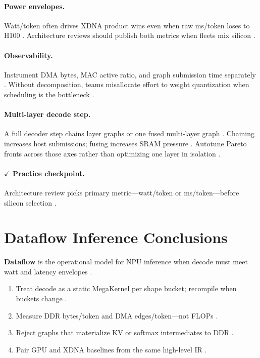 \paragraph{Power envelopes.}
Watt/token often drives XDNA product wins even when raw ms/token loses to H100 \citep{amd2024xdna,amd2024aie,memoryfloor2026,patel2025llminference}.
Architecture reviews should publish both metrics when fleets mix silicon \citep{yirage2026,taxbreak2026}.

\paragraph{Observability.}
Instrument DMA bytes, MAC active ratio, and graph submission time separately \citep{amd2024xdna,patel2025llminference,memoryfloor2026}.
Without decomposition, teams misallocate effort to weight quantization when scheduling is the bottleneck \citep{yirage2026,amd2024aie}.

\paragraph{Multi-layer decode step.}
A full decoder step chains layer graphs or one fused multi-layer graph \citep{yirage2026,amd2024aie}.
Chaining increases host submissions; fusing increases SRAM pressure \citep{patel2025llminference,memoryfloor2026}.
Autotune Pareto fronts across those axes rather than optimizing one layer in isolation \citep{yirage2026,chen2020compilerbasedhardw}.

\paragraph{$\checkmark$ Practice checkpoint.}
Architecture review picks primary metric---watt/token or ms/token---before silicon selection \citep{amd2024xdna,patel2025llminference}.

\section{Dataflow Inference Conclusions}
\label{sec:ch05_dataflow_conclusion}

\textbf{Dataflow} is the operational model for NPU inference when decode must meet watt and latency envelopes \citep{amd2024xdna,chen2020compilerbasedhardw,yirage2026}.

\begin{enumerate}
\item Treat decode as a static MegaKernel per shape bucket; recompile when buckets change \citep{yirage2026,patel2025llminference}.
\item Measure DDR bytes/token and DMA edges/token---not FLOPs \citep{memoryfloor2026,taxbreak2026}.
\item Reject graphs that materialize KV or softmax intermediates to DDR \citep{dao2022flashattention,dao2023flashdecoding}.
\item Pair GPU and XDNA baselines from the same high-level IR \citep{chen2020compilerbasedhardw,yirage2026}.
\end{enumerate}

